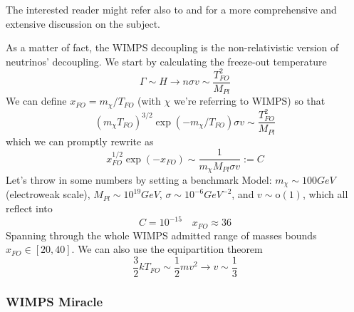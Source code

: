 The interested reader might refer also to \cite{cirelli2025darkmatter} and \cite{profumo2013tasi2012lecturesastrophysical} for a more comprehensive and extensive discussion on the subject.
\par As a matter of fact, the WIMPS decoupling is the non-relativistic version of neutrinos' decoupling. We start by calculating the freeze-out temperature
\begin{equation}
    \Gamma \sim H \to n\sigma v \sim \frac{T_{FO}^{2}}{M_{Pl}}
\end{equation}
We can define $x_{FO} = m_{\chi}/T_{FO}$ (with $\chi$ we're referring to WIMPS) so that 
\begin{equation}
    (m_{\chi}T_{FO})^{3/2}\exp\left(-m_{\chi}/T_{FO}\right)\sigma v \sim \frac{T_{FO}^{2}}{M_{Pl}}
\end{equation}
which we can promptly rewrite as 
\begin{equation}
    \boxed{
        x_{FO}^{1/2}\exp(-x_{FO}) \sim \frac{1}{m_{\chi}M_{Pl}\sigma v} := C
    }
\end{equation}
Let's throw in some numbers by setting a benchmark Model: $m_{\chi} \sim 100\unit{GeV}$ (electroweak scale), $M_{Pl}\sim 10^{19}\unit{GeV}$, $\sigma \sim 10^{-6}\unit{GeV}^{-2}$, and $v \sim \text{o}(1)$, which all reflect into
\begin{equation}
    C = 10^{-15} \quad x_{FO} \approx 36
\end{equation}
Spanning through the whole WIMPS admitted range of masses bounds $x_{FO}\in [20,40]$. We can also use the equipartition theorem
\begin{equation}
    \frac{3}{2}kT_{FO} \sim \frac{1}{2}mv^{2}\to v \sim \frac{1}{3}
\end{equation}

\subsubsection{WIMPS Miracle}

